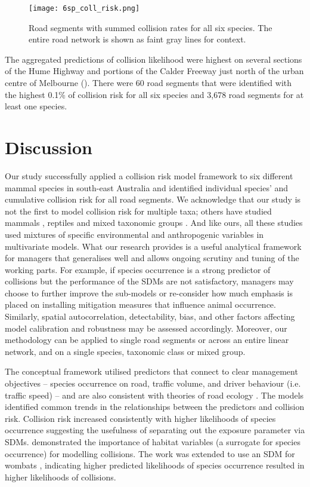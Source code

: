 \begin{figure*}[!t]
  \centering
  \texttt{[image: 6sp\_coll\_risk.png]}
  \caption[Road segments with predictions of high collision likelihood for six mammal species]{Road segments with summed collision rates for all six species. The entire road network is shown as faint gray lines for context.}
  \label{6sp_collrisk}
\end{figure*}

The aggregated predictions of collision likelihood were highest on several sections of the Hume Highway and portions of the Calder Freeway just north of the urban centre of Melbourne (). There were 60 road segments that were identified with the highest 0.1\% of collision risk for all six species and 3,678 road segments for at least one species.

\section{Discussion}

Our study successfully applied a collision risk model framework to six different mammal species in south-east Australia and identified individual species' and cumulative collision risk for all road segments. We acknowledge that our study is not the first to model collision risk for multiple taxa; others have studied mammals \citep{clev02,cser13,jaar06}, reptiles \citep{guns12,lang12} and mixed taxonomic groups \citep{clev02,garr15,lang09,litv08}.  And like ours, all these studies used mixtures of specific environmental and anthropogenic variables in multivariate models. What our research provides is a useful analytical framework for managers that generalises well and allows ongoing scrutiny and tuning of the working parts.  For example, if species occurrence is a strong predictor of collisions but the performance of the SDMs are not satisfactory, managers may choose to further improve the sub-models or re-consider how much emphasis is placed on installing mitigation measures that influence animal occurrence.  Similarly, spatial autocorrelation, detectability, bias, and other factors affecting model calibration and robustness may be assessed accordingly. Moreover, our methodology can be applied to single road segments or across an entire linear network, and on a single species, taxonomic class or mixed group.

The conceptual framework utilised predictors that connect to clear management objectives -- species occurrence on road, traffic volume, and driver behaviour (i.e. traffic speed) -- and are also consistent with theories of road ecology \citep[see][]{form03}. The models identified common trends in the relationships between the predictors and collision risk. Collision risk increased consistently with higher likelihoods of species occurrence suggesting the usefulness of separating out the exposure parameter via SDMs. \cite{roge09} demonstrated the importance of habitat variables (a surrogate for species occurrence) for modelling collisions. The work was extended to use an SDM for wombats \citep{roge12}, indicating higher predicted likelihoods of species occurrence resulted in higher likelihoods of collisions.

